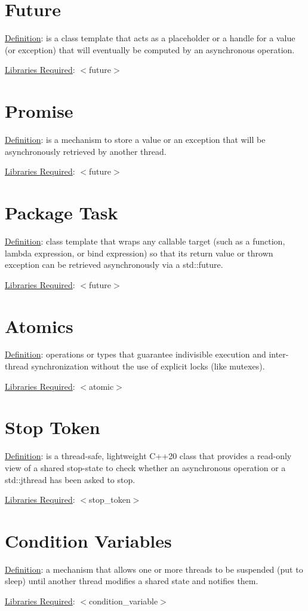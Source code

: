 \documentclass[twocolumn]{article}
\begin{document}
\section{Future}
\underline{Definition}: is a class template that acts as a placeholder or a handle for a value (or exception) that will eventually be computed by an asynchronous operation.

\bigbreak \noindent \underline{Libraries Required}: $<$future$>$

\section{Promise}
\underline{Definition}: is a mechanism to store a value or an exception that will be asynchronously retrieved by another thread.

\bigbreak \noindent \underline{Libraries Required}: $<$future$>$

\section{Package Task}
\underline{Definition}: class template that wraps any callable target (such as a function, lambda expression, or bind expression) so that its return value or thrown exception can be retrieved asynchronously via a std::future.

\bigbreak \noindent \underline{Libraries Required}: $<$future$>$


\section{Atomics}
\underline{Definition}: operations or types that guarantee indivisible execution and inter-thread synchronization without the use of explicit locks (like mutexes).

\bigbreak \noindent \underline{Libraries Required}: $<$atomic$>$

\section{Stop Token}
\underline{Definition}: is a thread-safe, lightweight C++20 class that provides a read-only view of a shared stop-state to check whether an asynchronous operation or a std::jthread has been asked to stop.

\bigbreak \noindent \underline{Libraries Required}: $<$stop\_token$>$

\section{Condition Variables}
\underline{Definition}: a mechanism that allows one or more threads to be suspended (put to sleep) until another thread modifies a shared state and notifies them.

\bigbreak \noindent \underline{Libraries Required}: $<$condition\_variable$>$
\end{document}
